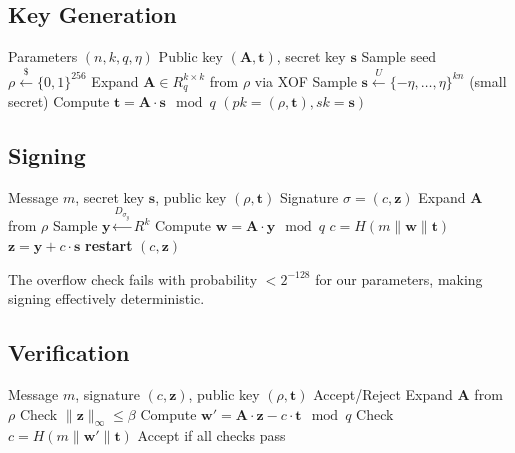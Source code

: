 \documentclass[11pt,a4paper]{article}
\begin{document}
\subsection{Key Generation}

\begin{algorithm}
\caption{Ringtail Key Generation}
\begin{algorithmic}[1]
\Require Parameters $(n, k, q, \eta)$
\Ensure Public key $(\mathbf{A}, \mathbf{t})$, secret key $\mathbf{s}$
\State Sample seed $\rho \xleftarrow{\$} \{0,1\}^{256}$
\State Expand $\mathbf{A} \in R_q^{k \times k}$ from $\rho$ via XOF
\State Sample $\mathbf{s} \xleftarrow{U} \{-\eta, \ldots, \eta\}^{kn}$ (small secret)
\State Compute $\mathbf{t} = \mathbf{A} \cdot \mathbf{s} \mod q$
\State \Return $(pk = (\rho, \mathbf{t}), sk = \mathbf{s})$
\end{algorithmic}
\end{algorithm}

\subsection{Signing}

\begin{algorithm}
\caption{Ringtail Sign}
\begin{algorithmic}[1]
\Require Message $m$, secret key $\mathbf{s}$, public key $(\rho, \mathbf{t})$
\Ensure Signature $\sigma = (c, \mathbf{z})$
\State Expand $\mathbf{A}$ from $\rho$
\State Sample $\mathbf{y} \xleftarrow{D_{\sigma_y}} R^k$
\State Compute $\mathbf{w} = \mathbf{A} \cdot \mathbf{y} \mod q$
\State $c = H(m \| \mathbf{w} \| \mathbf{t})$ 
\State $\mathbf{z} = \mathbf{y} + c \cdot \mathbf{s}$ 
 
    \State \textbf{restart}
\EndIf
\State \Return $(c, \mathbf{z})$
\end{algorithmic}
\end{algorithm}

The overflow check fails with probability $< 2^{-128}$ for our parameters, making signing effectively deterministic.

\subsection{Verification}

\begin{algorithm}
\caption{Ringtail Verify}
\begin{algorithmic}[1]
\Require Message $m$, signature $(c, \mathbf{z})$, public key $(\rho, \mathbf{t})$
\Ensure Accept/Reject
\State Expand $\mathbf{A}$ from $\rho$
\State Check $\|\mathbf{z}\|_\infty \leq \beta$
\State Compute $\mathbf{w}' = \mathbf{A} \cdot \mathbf{z} - c \cdot \mathbf{t} \mod q$
\State Check $c = H(m \| \mathbf{w}' \| \mathbf{t})$
\State \Return Accept if all checks pass
\end{algorithmic}
\end{algorithm}
\end{document}
